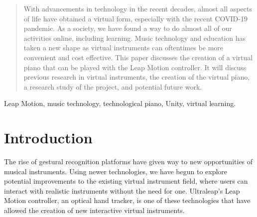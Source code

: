 \documentclass[conference,compsoc]{IEEEtran}
\begin{document}




\maketitle

\begin{abstract}
With advancements in technology in the recent decades, almost all aspects of life have obtained a virtual form, especially with the recent COVID-19 pandemic. As a society, we have found a way to do almost all of our activities online, including learning. Music technology and education has taken a new shape as virtual instruments can oftentimes be more convenient and cost effective. This paper discusses the creation of a virtual piano that can be played with the Leap Motion controller. It will discuss previous research in virtual instruments, the creation of the virtual piano, a research study of the project, and potential future work.
\end{abstract}

\begin{IEEEkeywords}
Leap Motion, music technology, technological piano, Unity, virtual learning.
\end{IEEEkeywords}




%
\IEEEpeerreviewmaketitle



\section{Introduction}

The rise of gestural recognition platforms have given way to new opportunities of musical instruments. Using newer technologies, we have begun to explore potential improvements to the existing virtual instrument field, where users can interact with realistic instruments without the need for one.
Ultraleap's Leap Motion controller, an optical hand tracker, is one of these technologies that have allowed the creation of new interactive virtual instruments.
\end{document}

